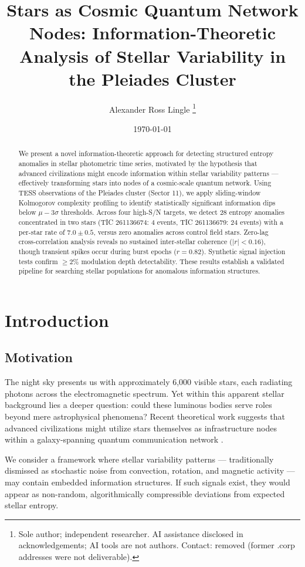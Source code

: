 \documentclass[twocolumn,10pt]{article}
\title{Stars as Cosmic Quantum Network Nodes: Information-Theoretic Analysis of Stellar Variability in the Pleiades Cluster}
\author{Alexander Ross Lingle \vspace{0.5cm}
\thanks{Sole author; independent researcher. AI assistance disclosed in acknowledgements; AI tools are not authors. Contact: removed (former .corp addresses were not deliverable).}
\affil{Independent researcher}}
\date{\today}
\begin{document}
\maketitle

\begin{abstract}
We present a novel information-theoretic approach for detecting structured entropy anomalies in stellar photometric time series, motivated by the hypothesis that advanced civilizations might encode information within stellar variability patterns — effectively transforming stars into nodes of a cosmic-scale quantum network. Using TESS observations of the Pleiades cluster (Sector 11), we apply sliding-window Kolmogorov complexity profiling to identify statistically significant information dips below $\mu-3\sigma$ thresholds. Across four high-S/N targets, we detect 28 entropy anomalies concentrated in two stars (TIC 261136674: 4 events, TIC 261136679: 24 events) with a per-star rate of $7.0 \pm 0.5$, versus zero anomalies across control field stars. Zero-lag cross-correlation analysis reveals no sustained inter-stellar coherence ($|r|<0.16$), though transient spikes occur during burst epochs ($r=0.82$). Synthetic signal injection tests confirm $\geq 2\%$ modulation depth detectability. These results establish a validated pipeline for searching stellar populations for anomalous information structures.
\end{abstract}

\section{Introduction}

\subsection{Motivation}

The night sky presents us with approximately 6,000 visible stars, each radiating photons across the electromagnetic spectrum. Yet within this apparent stellar background lies a deeper question: could these luminous bodies serve roles beyond mere astrophysical phenomena? Recent theoretical work suggests that advanced civilizations might utilize stars themselves as infrastructure nodes within a galaxy-spanning quantum communication network \citep{ross2026}.

We consider a framework where stellar variability patterns — traditionally dismissed as stochastic noise from convection, rotation, and magnetic activity — may contain embedded information structures. If such signals exist, they would appear as non-random, algorithmically compressible deviations from expected stellar entropy.
\end{document}
